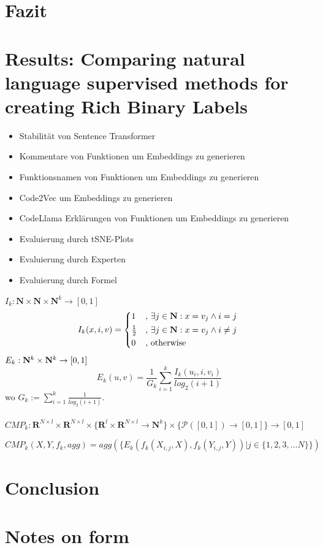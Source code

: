 \documentclass[12pt,letterpaper,ngerman]{article}
\begin{document}
\section{Fazit}
\section{Results: Comparing natural language supervised methods for creating Rich Binary Labels}
\begin{itemize}
  \item Stabilität von Sentence Transformer
  \item Kommentare von Funktionen um Embeddings zu generieren
  \item Funktionsnamen von Funktionen um Embeddings zu generieren
  \item Code2Vec um Embeddings zu generieren
  \item CodeLlama Erklärungen von Funktionen um Embeddings zu generieren
  \item Evaluierung durch tSNE-Plots
  \item Evaluierung durch Experten
  \item Evaluierung durch Formel
\end{itemize}
$ I_{k}: \mathbf{N} \times \mathbf{N} \times \mathbf{N}^{k} \to [0,1]$
\[ I_{k}(x,i,v) = \begin{cases*} 
      1 & , $\exists j \in \mathbf{N}: x = v_j \land i = j$  \\
      \frac{1}{2} & , $\exists j \in \mathbf{N}: x = v_j \land i \neq j$\\
      0   & , \text{otherwise}
                \end{cases*} \]
$E_k: \mathbf{N}^k \times \mathbf{N}^k \to [0,1]$
\[ E_k(u,v) = \frac{1}{G_k} \sum^{k}_{i=1} \frac{I_k(u_i,i,v_i)}{log_2(i+1)}\]
wo $G_k := \sum_{i=1}^{k} \frac{1}{log_2(i+1)}$.\\\\
$CMP_k: \mathbf{R}^{N\times l} \times \mathbf{R}^{N\times l} \times 
\{ \mathbf{R}^l \times \mathbf{R}^{N\times l} \to \mathbf{N}^k \} 
\times \{ \mathcal{P}([0,1]) \to [0,1] \} \to [0,1]$

\[ CMP_k(X,Y,f_k,agg) = agg(\{E_k(f_k(X_{i,j},X),f_k(Y_{i,j},Y)) | j \in \{1,2,3, \dots N\}\})\]


\section{Conclusion}


\section{Notes on form}
\end{document}
